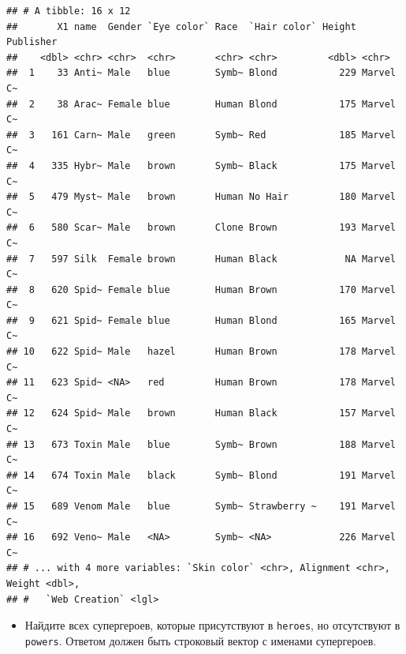 \documentclass[]{book}
\newenvironment{Shaded}{\begin{snugshade}}{\end{snugshade}}
\newcommand{\KeywordTok}[1]{\textcolor[rgb]{0.13,0.29,0.53}{\textbf{#1}}}
\newcommand{\DataTypeTok}[1]{\textcolor[rgb]{0.13,0.29,0.53}{#1}}
\newcommand{\StringTok}[1]{\textcolor[rgb]{0.31,0.60,0.02}{#1}}
\newcommand{\OperatorTok}[1]{\textcolor[rgb]{0.81,0.36,0.00}{\textbf{#1}}}
\newcommand{\NormalTok}[1]{#1}
\providecommand{\tightlist}{%
  \setlength{\itemsep}{0pt}\setlength{\parskip}{0pt}}
\begin{document}
\begin{verbatim}
## # A tibble: 16 x 12
##       X1 name  Gender `Eye color` Race  `Hair color` Height Publisher
##    <dbl> <chr> <chr>  <chr>       <chr> <chr>         <dbl> <chr>    
##  1    33 Anti~ Male   blue        Symb~ Blond           229 Marvel C~
##  2    38 Arac~ Female blue        Human Blond           175 Marvel C~
##  3   161 Carn~ Male   green       Symb~ Red             185 Marvel C~
##  4   335 Hybr~ Male   brown       Symb~ Black           175 Marvel C~
##  5   479 Myst~ Male   brown       Human No Hair         180 Marvel C~
##  6   580 Scar~ Male   brown       Clone Brown           193 Marvel C~
##  7   597 Silk  Female brown       Human Black            NA Marvel C~
##  8   620 Spid~ Female blue        Human Brown           170 Marvel C~
##  9   621 Spid~ Female blue        Human Blond           165 Marvel C~
## 10   622 Spid~ Male   hazel       Human Brown           178 Marvel C~
## 11   623 Spid~ <NA>   red         Human Brown           178 Marvel C~
## 12   624 Spid~ Male   brown       Human Black           157 Marvel C~
## 13   673 Toxin Male   blue        Symb~ Brown           188 Marvel C~
## 14   674 Toxin Male   black       Symb~ Blond           191 Marvel C~
## 15   689 Venom Male   blue        Symb~ Strawberry ~    191 Marvel C~
## 16   692 Veno~ Male   <NA>        Symb~ <NA>            226 Marvel C~
## # ... with 4 more variables: `Skin color` <chr>, Alignment <chr>, Weight <dbl>,
## #   `Web Creation` <lgl>
\end{verbatim}

\begin{itemize}
\tightlist
\item
  Найдите всех супергероев, которые присутствуют в \texttt{heroes}, но
  отсутствуют в \texttt{powers}. Ответом должен быть строковый вектор с
  именами супергероев.
\end{itemize}

\begin{Shaded}
\end{Shaded}
\end{document}
